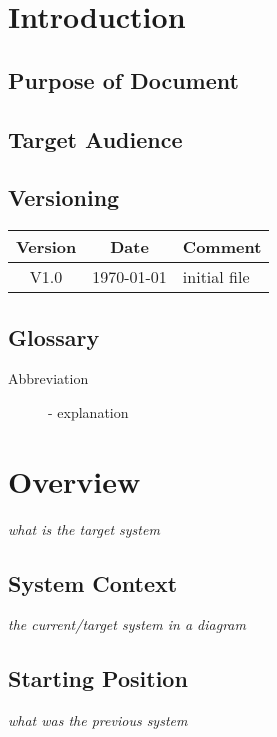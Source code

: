 \documentclass[a4paper, 10pt, fleqn]{article}
\begin{document}
	\begin{titlepage}
		\titleGM
		\thispagestyle{empty}
	\end{titlepage}
	
	\tableofcontents
	\listoffigures
	\listoftables
	
	\clearpage
	\section{Introduction}
		\subsection{Purpose of Document}
		\subsection{Target Audience}
		\subsection{Versioning}
			\begin{table}[h]
				\centering
				\begin{tabularx}{\textwidth}{|c|c|X|}
				\hline
				\rowcolor{shadecolor}\textbf{Version} & \textbf{Date} & \textbf{Comment}\\ \hline
				V1.0 & \today & initial file \\ \hline
				\end{tabularx}
			\end{table}
		\subsection{Glossary}
			\begin{description}
				\item[Abbreviation]- explanation
			\end{description}

	\section{Overview}
		\textit{what is the target system}
		\subsection{System Context}
			\textit{the current/target system in a diagram}
		\subsection{Starting Position}
			\textit{what was the previous system}
\end{document}
